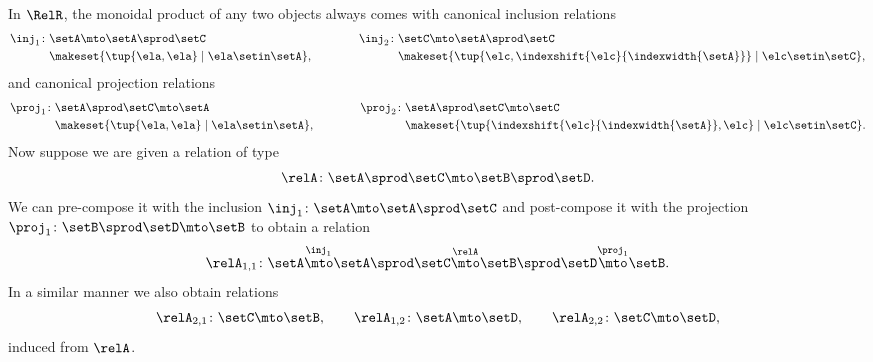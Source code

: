 In $\RelR$, the monoidal product of any two objects always comes with canonical inclusion relations
\begin{equation}
    \begin{aligned}
        \inj_1 \colon & \setA \mto \setA\sprod\setC \\
                      & \makeset{ \tup{\ela, \ela} \mid \ela \setin \setA },
    \end{aligned}
    \qquad \qquad
    \begin{aligned}
        \inj_2 \colon & \setC  \mto \setA\sprod\setC \\
                      & \makeset{ \tup{\elc, \indexshift{\elc}{\indexwidth{\setA}}} \mid \elc \setin \setC },
    \end{aligned}
\end{equation}
and canonical projection relations
\begin{equation}
    \begin{aligned}
        \proj_1 \colon & \setA\sprod\setC \mto \setA \\
                       & \makeset{ \tup{\ela, \ela} \mid \ela \setin \setA },
    \end{aligned}
    \qquad \qquad
    \begin{aligned}
        \proj_2 \colon & \setA\sprod\setC  \mto \setC \\
                       & \makeset{ \tup{\indexshift{\elc}{\indexwidth{\setA}}, \elc} \mid \elc \setin \setC }.
    \end{aligned}
\end{equation}
Now suppose we are given a relation of type
\begin{equation}
    \relA \colon \setA \sprod \setC \mto \setB \sprod \setD.
\end{equation}
We can pre-compose it with the inclusion $\inj_1 \colon \setA \mto \setA\sprod\setC$ and post-compose it with the projection $\proj_1 \colon \setB \sprod\setD \mto \setB$ to obtain a relation
\begin{equation}
    \relA_{1,1} \colon \setA \overset{\inj_1}{\mto} \setA \sprod \setC \overset{\relA}{\mto} \setB \sprod \setD \overset{\proj_1}{\mto} \setB.
\end{equation}
In a similar manner we also obtain relations
\begin{equation}
    \relA_{2, 1} \colon \setC \mto \setB, \qquad \relA_{1, 2} \colon \setA \mto \setD, \qquad \relA_{2, 2} \colon \setC \mto \setD,
\end{equation}
induced from $\relA$.
